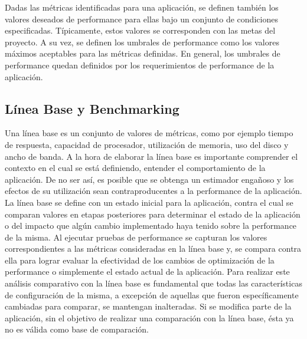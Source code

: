 Dadas las métricas identificadas para una aplicación, se definen también los valores deseados de performance para ellas bajo un conjunto de condiciones especificadas. Típicamente, estos valores se corresponden con las metas del proyecto. A su vez, se definen los umbrales de performance como los valores máximos aceptables para las métricas definidas. En general, los umbrales de performance quedan definidos por los requerimientos de performance de la aplicación.

\subsection{Línea Base y Benchmarking}
	Una línea base es un conjunto de valores de métricas, como por ejemplo tiempo de respuesta, capacidad de procesador, utilización de memoria, uso del disco y ancho de banda. A la hora de elaborar la línea base es importante comprender el contexto en el cual se está definiendo, entender el comportamiento de la aplicación. De no ser así, es posible que se obtenga un estimador engañoso y los efectos de su utilización sean contraproducentes a la performance de la aplicación. 
	La línea base se define con un estado inicial para la aplicación, contra el cual se comparan valores en etapas posteriores para determinar el estado de la aplicación o del impacto que algún cambio implementado haya tenido sobre la performance de la misma.
	Al ejecutar pruebas de performance se capturan los valores correspondientes a las métricas consideradas en la línea base y, se compara contra ella para lograr evaluar la efectividad de los cambios de optimización de la performance o simplemente el estado actual de la aplicación.
Para realizar este análisis comparativo con la línea base es fundamental que todas las características de configuración de la misma, a excepción de aquellas que fueron específicamente cambiadas para comparar, se mantengan inalteradas. Si se modifica parte de la aplicación, sin el objetivo de realizar una comparación con la línea base, ésta ya no es válida como base de comparación.

